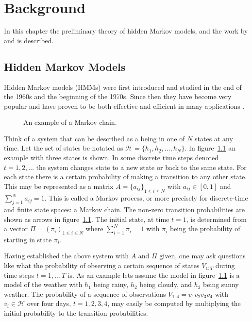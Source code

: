 
\chapter{Background}
\label{cha:background}

In this chapter the preliminary theory of hidden Markov models, and
the work by \citet{lifshits2009speeding} and \citet{sand2013ziphmmlib} is
described.

\section{Hidden Markov Models}
\label{sec:hidden-markov-models}

Hidden Markov models (HMMs) were first introduced and
studied in the end of the 1960s and the beginning of the 1970s. Since then they
have become very popular and have proven to be both effective and efficient in
many applications \citep{rabiner1989tutorial}.

\begin{figure}
  \centering
  
  \caption{An example of a Markov chain.}
  \label{fig:markov-chain}
\end{figure}

Think of a system that can be described as a being in one of $N$ states at any
time. Let the set of states be notated as $\mathcal{H} = \{h_1, h_2, \dots, h_N\}$.
In figure~\ref{fig:markov-chain} an example with three states is shown. In some
discrete time steps denoted $t = 1, 2, \dots$ the system changes state to a new
state or back to the same state. For each state there is a certain probability
of making a transition to any other state. This may be represented as a matrix
$A = {\{a_{ij}\}}_{1 \le i \le N}$ with $a_{ij} \in [0, 1]$ and
$\sum_{j = 1}^N a_{ij} = 1$. This is called a Markov process, or more precisely
for discrete-time and finite state spaces: a Markov chain. The non-zero
transition probabilities are shown as arrows in
figure~\ref{fig:markov-chain}. The initial state, at time $t = 1$, is
determined from a vector $\Pi = {(\pi_i)}_{1 \le i \le N}$ where
$\sum_{i=1}^N \pi_i = 1$ with $\pi_i$ being the probability of starting in
state $\pi_i$.

Having established the above system with $A$ and $\Pi$ given, one may ask
questions like what the probability of observing a certain sequence of states
$V_{1:T}$ during time steps $t = 1, \dots\ T$ is. As an example lets assume the
model in figure~\ref{fig:markov-chain} is a model of the weather with $h_1$
being rainy, $h_2$ being cloudy, and $h_3$ being sunny weather. The probability
of a sequence of observations $V_{1:4} = v_1v_2v_3v_4$ with
$v_i \in \mathcal{H}$ over four days, $t = 1, 2, 3, 4$, may easily be computed
by multiplying the initial probability to the transition probabilities.

